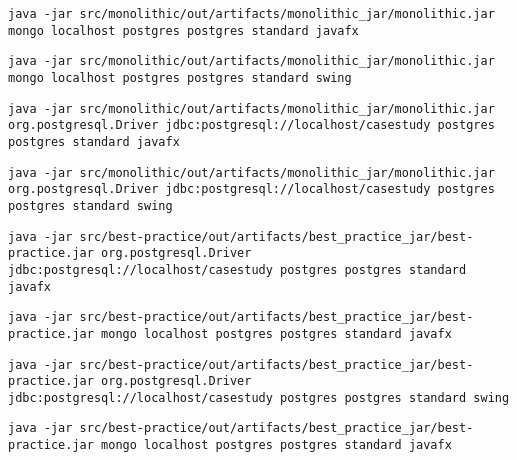 \begin{footnotesize}
	\texttt{java -jar src/monolithic/out/artifacts/monolithic\_jar/monolithic.jar mongo localhost postgres postgres standard javafx}
	
	\texttt{java -jar src/monolithic/out/artifacts/monolithic\_jar/monolithic.jar mongo localhost postgres postgres standard swing}
	
	\texttt{java -jar src/monolithic/out/artifacts/monolithic\_jar/monolithic.jar \\ org.postgresql.Driver jdbc:postgresql://localhost/casestudy  postgres postgres standard javafx} 
	
	\texttt{java -jar src/monolithic/out/artifacts/monolithic\_jar/monolithic.jar\\
		org.postgresql.Driver jdbc:postgresql://localhost/casestudy  postgres postgres standard swing} 
	
	\texttt{java -jar src/best-practice/out/artifacts/best\_practice\_jar/best-practice.jar org.postgresql.Driver jdbc:postgresql://localhost/casestudy  postgres postgres standard javafx
	}

	\texttt{java -jar src/best-practice/out/artifacts/best\_practice\_jar/best-practice.jar mongo localhost  postgres postgres standard javafx
	} 

	\texttt{java -jar src/best-practice/out/artifacts/best\_practice\_jar/best-practice.jar org.postgresql.Driver jdbc:postgresql://localhost/casestudy  postgres postgres standard swing
	} 

	\texttt{java -jar src/best-practice/out/artifacts/best\_practice\_jar/best-practice.jar mongo localhost postgres postgres standard javafx
	} 
\end{footnotesize}



